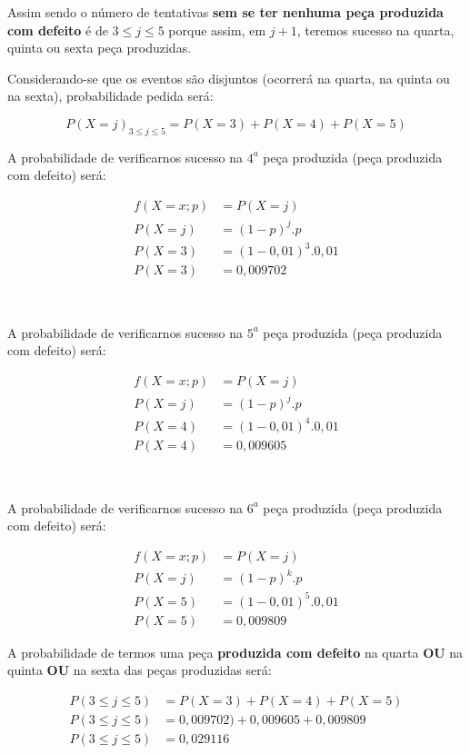 \documentclass[
]{book}
\begin{document}
Assim sendo o número de tentativas \textbf{sem se ter nenhuma peça produzida com defeito} é de \(3 \le j \le 5\) porque assim, em \(j+1\), teremos sucesso na quarta, quinta ou sexta peça produzidas.

\hfill\break

Considerando-se que os eventos são disjuntos (ocorrerá na quarta, na quinta ou na sexta), probabilidade pedida será:

\[
P(X=j)_{3 \le j \le 5}= P(X=3) + P(X=4) + P(X=5)
\]

\hfill\break

A probabilidade de verificarnos sucesso na \(4^{a}\) peça produzida (peça produzida com defeito) será:

\hfill\break

\begin{align*}
f(X=x; p) & = P(X=j) \\
P(X=j)    & = (1-p)^{j} . p  \\
P(X=3)    & = (1-0,01)^{3} . 0,01 \\
P(X=3)    & = 0,009702
\end{align*}

~

A probabilidade de verificarnos sucesso na \(5^{a}\) peça produzida (peça produzida com defeito) será:

\begin{align*}
f(X=x; p) & = P(X=j) \\
P(X=j)    & = (1-p)^{j} . p \\
P(X=4)    & = (1-0,01)^{4} . 0,01 \\
P(X=4)   & = 0,009605
\end{align*}

~

A probabilidade de verificarnos sucesso na \(6^{a}\) peça produzida (peça produzida com defeito) será:

\begin{align*}
f(X=x; p) & = P(X=j) \\
P(X=j)   & = (1-p)^{k} . p \\
P(X=5)    & = (1-0,01)^{5} . 0,01 \\
P(X=5)    & = 0,009809    
\end{align*}

\hfill\break

A probabilidade de termos uma peça \textbf{produzida com defeito } na quarta \textbf{OU} na quinta \textbf{OU} na sexta das peças produzidas será:

\begin{align*}
P(3 \le j \le 5)  &  = P(X=3) + P(X=4) + P(X=5) \\
P(3 \le j \le 5)  &  = 0,009702) + 0,009605 + 0,009809 \\
P(3 \le j \le 5)  &  = 0,029116 
\end{align*}
\end{document}
